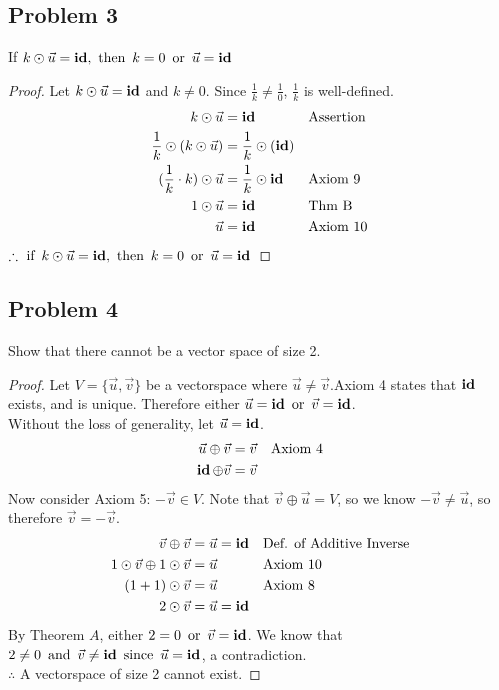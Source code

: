 \documentclass{article}
\begin{document}
\subsection*{Problem 3}
 If $k \odot \vec{u} = \operatorname{\textbf{id}}, \operatorname{~\text{then}~} k=0 \operatorname{~\text{or}~} \vec{u} = \operatorname{\textbf{id}}$
\begin{proof}
    Let $k \odot \vec{u} = \operatorname{\textbf{id}}$ and $k \neq 0 $. Since $\frac{1}{k} \neq \frac{1}{0}$, $\frac{1}{k}$ is well-defined.
    \begin{align*}
        k \odot \vec{u}                     & = \operatorname{\textbf{id}}                     &  & \text{Assertion} \\
        \frac{1}{k} \odot (k \odot \vec{u}) & = \frac{1}{k} \odot (\operatorname{\textbf{id}})                       \\
        (\frac{1}{k} \cdot k) \odot \vec{u} & = \frac{1}{k} \odot \operatorname{\textbf{id}}   &  & \text{Axiom 9}   \\
        1 \odot \vec{u}                     & = \operatorname{\textbf{id}}                     &  & \text{Thm B}     \\
        \vec{u}                             & = \operatorname{\textbf{id}}                     &  & \text{Axiom 10}
    \end{align*}
    $\therefore \operatorname{~\text{if}~} k \odot \vec{u} = \operatorname{\textbf{id}}, \operatorname{~\text{then}~} k=0 \operatorname{~\text{or}~} \vec{u} = \operatorname{\textbf{id}}$
\end{proof}

\subsection*{Problem 4}
Show that there cannot be a vector space of size 2.
\begin{proof}
    Let $V = \{\vec{u}, \vec{v}\}$ be a vectorspace where $\vec{u} \neq \vec{v}$.Axiom 4 states that $\operatorname{\textbf{id}}$ exists, and is unique. Therefore either $\vec{u} = \operatorname{\textbf{id}} \operatorname{~\text{or}~} \vec{v} = \operatorname{\textbf{id}}$. \\
    Without the loss of generality, let $\vec{u} = \operatorname{\textbf{id}}$.
    \begin{align*}
        \vec{u} \oplus \vec{v} & = \vec{v} & \text{Axiom 4} \\
        \operatorname{\textbf{id}} \oplus \vec{v}     & = \vec{v}
    \end{align*}
    Now consider Axiom 5: $-\vec{v} \in V$. Note that $\vec{v} \oplus \vec{u} = V$, so we know $-\vec{v} \neq \vec{u}$, so therefore $\vec{v} = -\vec{v}$.
    \begin{align*}
        \vec{v} \oplus \vec{v}                 & = \vec{u} = \operatorname{\textbf{id}} &  & \text{Def. of Additive Inverse} \\
        1 \odot \vec{v} \oplus 1 \odot \vec{v} & = \vec{u}       &  & \text{Axiom 10}                 \\
        (1+1) \odot \vec{v}                    & = \vec{u}       &  & \text{Axiom 8}                  \\
        2 \odot \vec{v}                        & = \vec{u} = \operatorname{\textbf{id}}
    \end{align*}
    By Theorem $A$, either $2 = 0 \operatorname{~\text{or}~} \vec{v} = \operatorname{\textbf{id}}$. We know that $2 \neq 0 \operatorname{~\text{and}~} \vec{v} \neq \operatorname{\textbf{id}} \operatorname{~\text{since}~} \vec{u} = \operatorname{\textbf{id}}$, a contradiction. \\
    $\therefore$ A vectorspace of size 2 cannot exist.

\end{proof}
\end{document}
